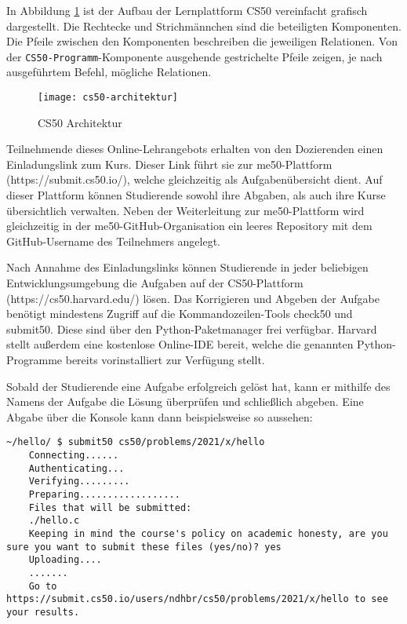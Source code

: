 In Abbildung \ref{fig:cs50-architektur} ist der Aufbau der Lernplattform CS50
vereinfacht grafisch dargestellt. Die Rechtecke und Strichmännchen sind die
beteiligten Komponenten. Die Pfeile zwischen den Komponenten beschreiben die
jeweiligen Relationen. Von der \texttt{CS50-Programm}-Komponente ausgehende
gestrichelte Pfeile zeigen, je nach ausgeführtem Befehl, mögliche Relationen.

\begin{figure}[h]
    \centering
    \texttt{[image: cs50-architektur]}
    \caption{CS50 Architektur}
    \label{fig:cs50-architektur}
\end{figure}

Teilnehmende dieses Online-Lehrangebots erhalten von den Dozierenden einen
Einladungslink zum Kurs. Dieser Link führt sie zur me50-Plattform
(https://submit.cs50.io/), welche gleichzeitig als Aufgabenübersicht dient.
Auf dieser Plattform können Studierende sowohl ihre Abgaben, als auch ihre Kurse
übersichtlich verwalten. Neben der Weiterleitung zur me50-Plattform wird
gleichzeitig in der me50-GitHub-Organisation ein leeres Repository mit dem
GitHub-Username des Teilnehmers angelegt.

Nach Annahme des Einladungslinks können Studierende in jeder beliebigen
Entwicklungsumgebung die Aufgaben auf der CS50-Plattform
(https://cs50.harvard.edu/) lösen. Das Korrigieren und Abgeben der Aufgabe
benötigt mindestens Zugriff auf die Kommandozeilen-Tools check50 und submit50.
Diese sind über den Python-Paketmanager frei verfügbar. Harvard stellt außerdem
eine kostenlose Online-IDE bereit, welche die genannten Python-Programme bereits
vorinstalliert zur Verfügung stellt.

Sobald der Studierende eine Aufgabe erfolgreich gelöst hat, kann er mithilfe des
Namens der Aufgabe die Lösung überprüfen und schließlich abgeben. Eine Abgabe
über die Konsole kann dann beispielsweise so aussehen:

\begin{lstlisting}[style=Bash]
    ~/hello/ $ submit50 cs50/problems/2021/x/hello
    Connecting......
    Authenticating...
    Verifying.........
    Preparing..................
    Files that will be submitted:
    ./hello.c
    Keeping in mind the course's policy on academic honesty, are you sure you want to submit these files (yes/no)? yes
    Uploading....
    .......
    Go to https://submit.cs50.io/users/ndhbr/cs50/problems/2021/x/hello to see your results.
\end{lstlisting}

